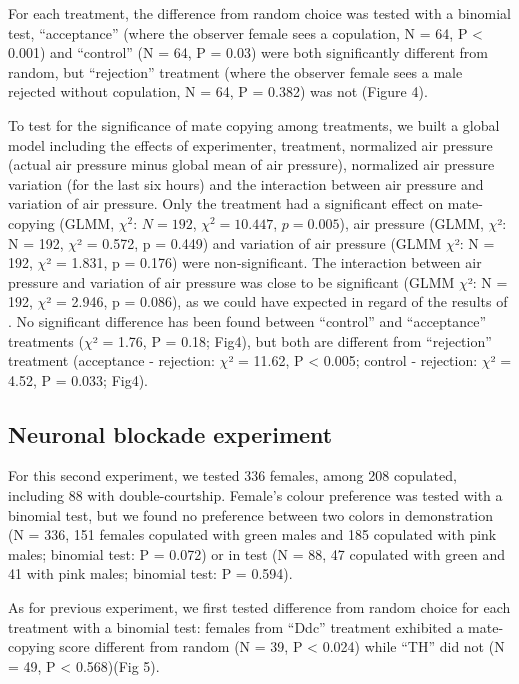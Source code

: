 \documentclass[a4paper, 12pt]{article}
\begin{document}
	For each treatment, the difference from random choice was tested with a binomial test, ``acceptance'' (where the observer female sees a copulation, N = 64, P {\textless} 0.001) and ``control'' (N = 64, P = 0.03) were both significantly different from random, but ``rejection'' treatment (where the observer female sees a male rejected without copulation, N = 64, P = 0.382) was not (Figure 4).

	To test for the significance of mate copying among treatments, we built a global model including the effects of experimenter, treatment, normalized air pressure (actual air pressure minus global mean of air pressure), normalized air pressure variation (for the last six hours) and the interaction between air pressure and variation of air pressure. Only the treatment had a significant effect on mate-copying (GLMM, $\chi^2$: $N = 192$, $\chi^2 = 10.447$, $p = 0.005$), air pressure (GLMM, $\chi $²: N = 192, $\chi $² = 0.572, p = 0.449) and variation of air pressure (GLMM $\chi $²: N = 192, $\chi $² = 1.831, p = 0.176) were non-significant. The interaction between air pressure and variation of air pressure was close to be significant (GLMM $\chi $²: N = 192, $\chi $² = 2.946, p = 0.086), as we could have expected in regard of the results of \textcite{dagaeff_drosophila_2016}. No significant difference has been found between ``control'' and ``acceptance'' treatments ($\chi $² = 1.76, P = 0.18; Fig4), but both are different from ``rejection'' treatment (acceptance - rejection: $\chi $² = 11.62, P {\textless} 0.005; control - rejection: $\chi $² = 4.52, P = 0.033; Fig4).
	
	\subsection{Neuronal blockade experiment}
	
	For this second experiment, we tested 336 females, among 208 copulated, including 88 with double-courtship. Female's colour preference was tested with a binomial test, but we found no preference between two colors in demonstration (N = 336, 151 females copulated with green males and 185 copulated with pink males; binomial test: P = 0.072) or in test (N = 88, 47 copulated with green and 41 with pink males; binomial test: P = 0.594).
	
	As for previous experiment, we first tested difference from random choice for each treatment with a binomial test: females from ``Ddc'' treatment exhibited a mate-copying score different from random (N = 39, P {\textless} 0.024) while ``TH'' did not (N = 49, P {\textless} 0.568)(Fig 5).
	
\end{document}
